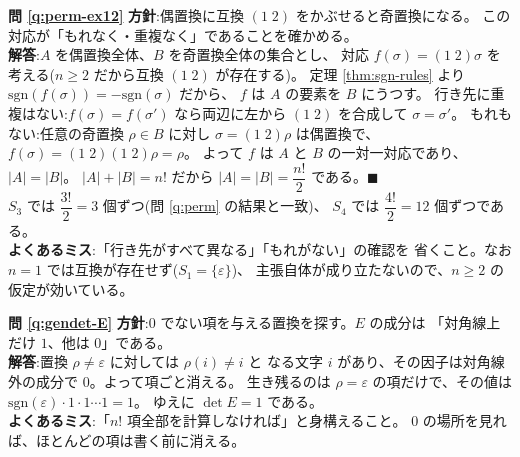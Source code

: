 \bigskip
\noindent\textbf{問 \ref{q:perm-ex12}}\quad
\textbf{方針}:偶置換に互換 $(1\;2)$ をかぶせると奇置換になる。
この対応が「もれなく・重複なく」であることを確かめる。\\
\textbf{解答}:$A$ を偶置換全体、$B$ を奇置換全体の集合とし、
対応 $f(\sigma) = (1\;2)\sigma$ を考える($n \ge 2$ だから互換
$(1\;2)$ が存在する)。
定理 \ref{thm:sgn-rules} より
$\mathrm{sgn}(f(\sigma)) = -\mathrm{sgn}(\sigma)$ だから、
$f$ は $A$ の要素を $B$ にうつす。
行き先に重複はない:$f(\sigma) = f(\sigma')$ なら両辺に左から
$(1\;2)$ を合成して $\sigma = \sigma'$。
もれもない:任意の奇置換 $\rho \in B$ に対し
$\sigma = (1\;2)\rho$ は偶置換で、$f(\sigma) = (1\;2)(1\;2)\rho = \rho$。
よって $f$ は $A$ と $B$ の一対一対応であり、$|A| = |B|$。
$|A| + |B| = n!$ だから $|A| = |B| = \dfrac{n!}{2}$ である。$\blacksquare$\\
$S_3$ では $\dfrac{3!}{2} = 3$ 個ずつ(問 \ref{q:perm} の結果と一致)、
$S_4$ では $\dfrac{4!}{2} = 12$ 個ずつである。\\
\textbf{よくあるミス}:「行き先がすべて異なる」「もれがない」の確認を
省くこと。なお $n = 1$ では互換が存在せず($S_1 = \{\varepsilon\}$)、
主張自体が成り立たないので、$n \ge 2$ の仮定が効いている。

\bigskip
\noindent\textbf{問 \ref{q:gendet-E}}\quad
\textbf{方針}:$0$ でない項を与える置換を探す。$E$ の成分は
「対角線上だけ $1$、他は $0$」である。\\
\textbf{解答}:置換 $\rho \neq \varepsilon$ に対しては $\rho(i) \neq i$ と
なる文字 $i$ があり、その因子は対角線外の成分で $0$。よって項ごと消える。
生き残るのは $\rho = \varepsilon$ の項だけで、その値は
$\mathrm{sgn}(\varepsilon) \cdot 1 \cdot 1 \cdots 1 = 1$。
ゆえに $\det E = 1$ である。\\
\textbf{よくあるミス}:「$n!$ 項全部を計算しなければ」と身構えること。
$0$ の場所を見れば、ほとんどの項は書く前に消える。

